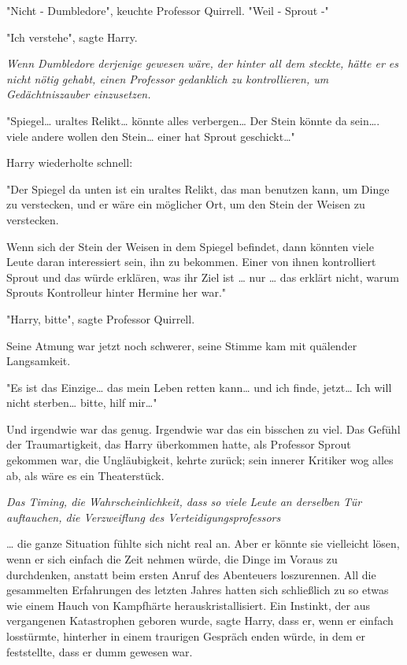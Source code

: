 {"Nicht - Dumbledore", keuchte Professor Quirrell. "Weil - Sprout -"

"Ich verstehe", sagte Harry.

\emph{Wenn Dumbledore derjenige gewesen wäre, der hinter all dem steckte, hätte er es nicht nötig gehabt, einen Professor gedanklich zu kontrollieren, um Gedächtniszauber einzusetzen.}

"Spiegel… uraltes Relikt… könnte alles verbergen… Der Stein könnte da sein…. viele andere wollen den Stein… einer hat Sprout geschickt…"

Harry wiederholte schnell:

"Der Spiegel da unten ist ein uraltes Relikt, das man benutzen kann, um Dinge zu verstecken, und er wäre ein möglicher Ort, um den Stein der Weisen zu verstecken.

Wenn sich der Stein der Weisen in dem Spiegel befindet, dann könnten viele Leute daran interessiert sein, ihn zu bekommen. Einer von ihnen kontrolliert Sprout und das würde erklären, was ihr Ziel ist … nur … das erklärt nicht, warum Sprouts Kontrolleur hinter Hermine her war."

"Harry, bitte", sagte Professor Quirrell.

Seine Atmung war jetzt noch schwerer, seine Stimme kam mit quälender Langsamkeit.

"Es ist das Einzige… das mein Leben retten kann… und ich finde, jetzt… Ich will nicht sterben… bitte, hilf mir…"

Und irgendwie war das genug. Irgendwie war das ein bisschen zu viel. Das Gefühl der Traumartigkeit, das Harry überkommen hatte, als Professor Sprout gekommen war, die Ungläubigkeit, kehrte zurück; sein innerer Kritiker wog alles ab, als wäre es ein Theaterstück.

\emph{Das Timing, die Wahrscheinlichkeit, dass so viele Leute an derselben Tür auftauchen, die Verzweiflung des Verteidigungsprofessors}

… die ganze Situation fühlte sich nicht real an. Aber er könnte sie vielleicht lösen, wenn er sich einfach die Zeit nehmen würde, die Dinge im Voraus zu durchdenken, anstatt beim ersten Anruf des Abenteuers loszurennen. All die gesammelten Erfahrungen des letzten Jahres hatten sich schließlich zu so etwas wie einem Hauch von Kampfhärte herauskristallisiert. Ein Instinkt, der aus vergangenen Katastrophen geboren wurde, sagte Harry, dass er, wenn er einfach losstürmte, hinterher in einem traurigen Gespräch enden würde, in dem er feststellte, dass er dumm gewesen war.

}
